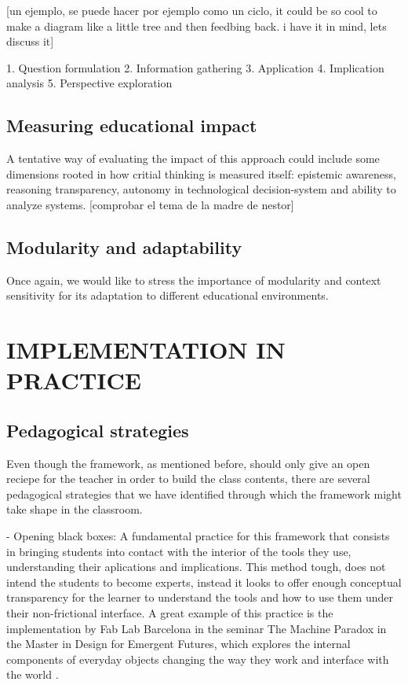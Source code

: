 \documentclass{article}
\begin{document}
[un ejemplo, se puede hacer por ejemplo como un ciclo, it could be so cool to make a diagram like a little tree and then feedbing back. i have it in mind, lets discuss it]

1. Question formulation
2. Information gathering
3. Application
4. Implication analysis
5. Perspective exploration


\subsection{Measuring educational impact}

A tentative way of evaluating the impact of this approach could include some dimensions rooted in how critial thinking is measured itself: epistemic awareness, reasoning transparency, autonomy in technological decision-system and ability to analyze systems. [comprobar el tema de la madre de nestor]

\subsection{Modularity and adaptability}
Once again, we would like to stress the importance of modularity and context sensitivity for its adaptation to different educational environments.


\section{IMPLEMENTATION IN PRACTICE}

\subsection{Pedagogical strategies}
Even though the framework, as mentioned before, should only give an open reciepe for the teacher in order to build the class contents, there are several pedagogical strategies that we have identified through which the framework might take shape in the classroom.

- Opening black boxes: A fundamental practice for this framework that consists in bringing students into contact with the interior of the tools they use, understanding their aplications and implications. This method tough, does not intend the students to become experts, instead it looks to offer enough conceptual transparency for the learner to understand the tools and how to use them under their non-frictional interface. A great example of this practice is the implementation by Fab Lab Barcelona in the seminar The Machine Paradox in the Master in Design for Emergent Futures, which explores the internal components of everyday objects changing the way they work and interface with the world \cite{mdef_machineparadox2024}.
\end{document}
